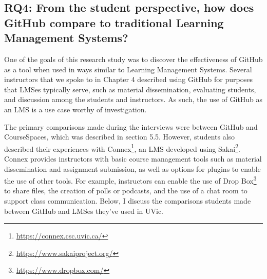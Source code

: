 \subsection{RQ4: From the student perspective, how does GitHub compare to traditional Learning Management Systems?}
One of the goals of this research study was to discover the effectiveness of GitHub as a tool when used in ways similar to Learning Management Systems. Several instructors that we spoke to in Chapter 4 described using GitHub for purposes that LMSes typically serve, such as material dissemination, evaluating students, and discussion among the students and instructors. As such, the use of GitHub as an LMS is a use case worthy of investigation.

The primary comparisons made during the interviews were between GitHub and CourseSpaces, which was described in section 5.5. However, students also described their experiences with Connex\footnote{\url{https://connex.csc.uvic.ca/}}, an LMS developed using Sakai\footnote{\url{https://www.sakaiproject.org/}}. Connex provides instructors with basic course management tools such as material dissemination and assignment submission, as well as options for plugins to enable the use of other tools. For example, instructors can enable the use of Drop Box\footnote{\url{https://www.dropbox.com/}} to share files, the creation of polls or podcasts, and the use of a chat room to support class communication. Below, I discuss the comparisons students made between GitHub and LMSes they've used in UVic. \\

